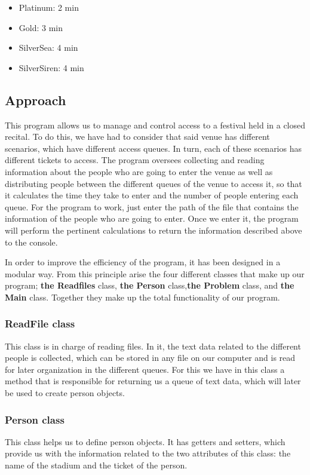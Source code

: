 \documentclass[a4paper]{article}
\theoremstyle{plain}
\theoremstyle{definition}
\begin{document}
        \begin{itemize}
            \item Platinum: 2 min
            \item Gold: 3 min
            \item SilverSea: 4 min
            \item SilverSiren: 4 min
        \end{itemize}

	    \subsection{Approach}
    This program allows us to manage and control access to a festival held in a closed recital. To do this, we have had to consider that said venue has different scenarios, which have different access queues. In turn, each of these scenarios has different tickets to access. The program oversees collecting and reading information about the people who are going to enter the venue as well as distributing people between the different queues of the venue to access it, so that it calculates the time they take to enter and the number of people entering each queue. For the program to work, just enter the path of the file that contains the information of the people who are going to enter. Once we enter it, the program will perform the pertinent calculations to return the information described above to the console. \newline

    In order to improve the efficiency of the program, it has been designed in a modular way. From this principle arise the four different classes that make up our program; \textbf{the Readfiles} class, \textbf{the Person} class,\textbf{the Problem } class, and \textbf{the Main}  class. Together they make up the total functionality of our program. 
            \subsubsection{ ReadFile class}
            This class is in charge of reading files. In it, the text data related to the different people is collected, which can be stored in any file on our computer and is read for later organization in the different queues. For this we have in this class a method that is responsible for returning us a queue of text data, which will later be used to create person objects. 
             \subsubsection{ Person class}
            This class helps us to define person objects. It has getters and setters, which provide us with the information related to the two attributes of this class: the name of the stadium and the ticket of the person. 
\end{document}
